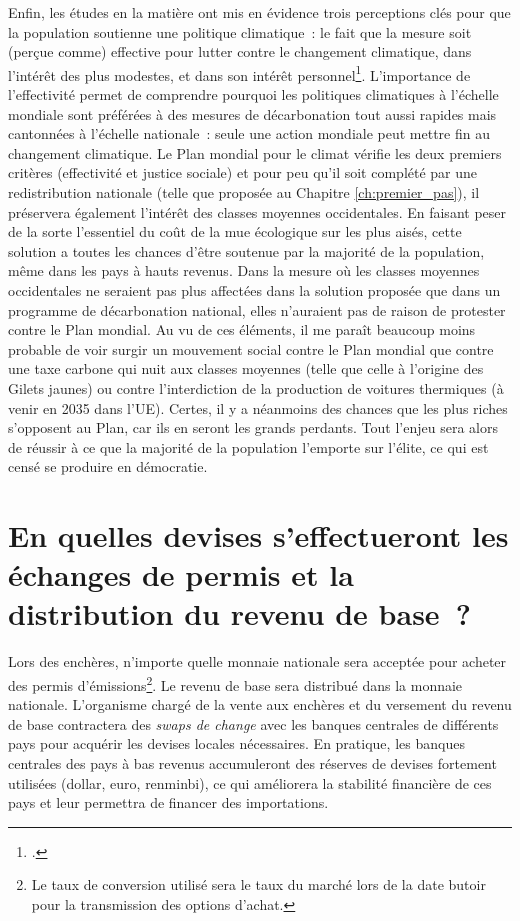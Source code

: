 \documentclass[a5paper,french,openany]{memoir}
\begin{document}
Enfin, les études en la matière ont mis en évidence trois perceptions clés pour que la population soutienne une politique climatique~: le fait que la mesure soit (perçue comme) effective pour lutter contre le changement climatique, dans l'intérêt des plus modestes, et dans son intérêt personnel\footnote{\cite{dechezlepretre_fighting_2022}.}. L'importance de l'effectivité permet de comprendre pourquoi les politiques climatiques à l'échelle mondiale sont préférées à des mesures de décarbonation tout aussi rapides mais cantonnées à l'échelle nationale~: seule une action mondiale peut mettre fin au changement climatique. Le Plan mondial pour le climat vérifie les deux premiers critères (effectivité et justice sociale) et pour peu qu'il soit complété par une redistribution nationale (telle que proposée au Chapitre \ref{ch:premier_pas}), il préservera également l'intérêt des classes moyennes occidentales. En faisant peser de la sorte l'essentiel du coût de la mue écologique sur les plus aisés, cette solution a toutes les chances d'être soutenue par la majorité de la population, même dans les pays à hauts revenus. Dans la mesure où les classes moyennes occidentales ne seraient pas plus affectées dans la solution proposée que dans un programme de décarbonation national, elles n'auraient pas de raison de protester contre le Plan mondial. Au vu de ces éléments, il me paraît beaucoup moins probable de voir surgir un mouvement social contre le Plan mondial que contre une taxe carbone qui nuit aux classes moyennes (telle que celle à l'origine des Gilets jaunes) ou contre l'interdiction de la production de voitures thermiques (à venir en 2035 dans l'UE). Certes, il y a néanmoins des chances que les plus riches s'opposent au Plan, car ils en seront les grands perdants. Tout l'enjeu sera alors de réussir à ce que la majorité de la population l'emporte sur l'élite, ce qui est censé se produire en démocratie.


\section*{\normalsize En quelles devises s'effectueront les échanges de permis et la distribution du revenu de base~?}\label{q:devise}

Lors des enchères, n'importe quelle monnaie nationale sera acceptée pour acheter des permis d'émissions\footnote{Le taux de conversion utilisé sera le taux du marché lors de la date butoir pour la transmission des options d'achat.}. Le revenu de base sera distribué dans la monnaie nationale. L'organisme chargé de la vente aux enchères et du versement du revenu de base contractera des \textit{swaps de change} avec les banques centrales de différents pays pour acquérir les devises locales nécessaires. En pratique, les banques centrales des pays à bas revenus accumuleront des réserves de devises fortement utilisées (dollar, euro, renminbi), ce qui améliorera la stabilité financière de ces pays et leur permettra de financer des importations.
\end{document}
